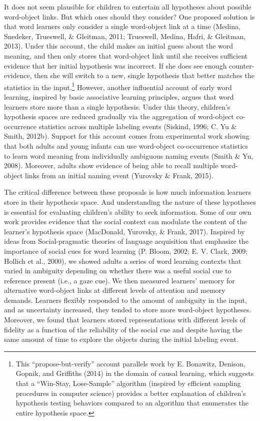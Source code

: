 \documentclass[english,floatsintext,man]{apa6}
\theoremstyle{definition}
\theoremstyle{definition}
\theoremstyle{definition}
\theoremstyle{remark}
\begin{document}
It does not seem plausible for children to entertain all hypotheses
about possible word-object links. But which ones should they consider?
One proposed solution is that word learners only consider a single
word-object link at a time (Medina, Snedeker, Trueswell, \& Gleitman,
2011; Trueswell, Medina, Hafri, \& Gleitman, 2013). Under this account,
the child makes an initial guess about the word meaning, and then only
stores that word-object link until she receives sufficient evidence that
her initial hypothesis was incorrect. If she does see enough
counter-evidence, then she will switch to a new, single hypothesis that
better matches the statistics in the input.\footnote{This
  \enquote{propose-but-verify} account parallels work by E. Bonawitz,
  Denison, Gopnik, and Griffiths (2014) in the domain of causal
  learning, which suggests that a \enquote{Win-Stay, Lose-Sample}
  algorithm (inspired by efficient sampling procedures in computer
  science) provides a better explanation of children's hypothesis
  testing behaviors compared to an algorithm that enumerates the entire
  hypothesis space.} However, another influential account of early word
learning, inspired by basic associative learning principles, argues that
word learners store more than a single hypothesis. Under this theory,
children's hypothesis spaces are reduced gradually via the aggregation
of word-object co-occurrence statistics across multiple labeling events
(Siskind, 1996; C. Yu \& Smith, 2012b). Support for this account comes
from experimental work showing that both adults and young infants can
use word-object co-occurrence statistics to learn word meaning from
individually ambiguous naming events (Smith \& Yu, 2008). Moreover,
adults show evidence of being able to recall multiple word-object links
from an initial naming event (Yurovsky \& Frank, 2015).

The critical difference between these proposals is how much information
learners store in their hypothesis space. And understanding the nature
of these hypotheses is essential for evaluating children's ability to
seek information. Some of our own work provides evidence that the social
context can modulate the content of the learner's hypothesis space
(MacDonald, Yurovsky, \& Frank, 2017). Inspired by ideas from
Social-pragmatic theories of language acquisition that emphasize the
importance of social cues for word learning (P. Bloom, 2002; E. V.
Clark, 2009; Hollich et al., 2000), we showed adults a series of word
learning contexts that varied in ambiguity depending on whether there
was a useful social cue to reference present (i.e., a gaze cue). We then
measured learners' memory for alternative word-object links at different
levels of attention and memory demands. Learners flexibly responded to
the amount of ambiguity in the input, and as uncertainty increased, they
tended to store more word-object hypotheses. Moreover, we found that
learners stored representations with different levels of fidelity as a
function of the reliability of the social cue and despite having the
same amount of time to explore the objects during the initial labeling
event.
\end{document}
